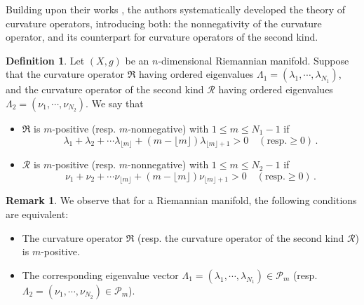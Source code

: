 \documentclass[12pt, twoside]{article}
\theoremstyle{definition}
\newtheorem{definition}[theorem]{Definition}
\newtheorem{remark}[theorem]{Remark}
\numberwithin{equation}{section}
\begin{document}
 
Building upon their works \cite{NPW23, NPWW23, PW21a, PW21b}, the authors systematically developed the theory of curvature operators, introducing both: the nonnegativity of the curvature operator, and its counterpart for curvature operators of the second kind.
\begin{definition}
Let $(X,g)$ be an $n$-dimensional Riemannian  manifold. Suppose that the curvature operator $\mathfrak{R}$ having ordered eigenvalues $\Lambda_{1}=(\lambda_{1},\cdots,\lambda_{N_1})$, and the curvature operator of the second kind $\mathcal{R}$ having ordered eigenvalues $\Lambda_{2}=(\nu_{1},\cdots,\nu_{N_2}) $. 
We say that 
\begin{itemize}
\item[(i)] $\mathfrak{R}$ is $m$-positive (resp. $m$-nonnegative) with $1\leq m\leq N_{1}-1$ if
$$\lambda_{1}+\lambda_{2}+\cdots\lambda_{\lfloor m\rfloor}+(m-\lfloor m\rfloor)\lambda_{\lfloor m\rfloor+1}>0\quad (\textrm{resp.} \geq 0) \,.$$
\item[(ii)] $\mathcal{R}$ is $m$-positive (resp. $m$-nonnegative) with $1\leq m\leq N_{2}-1$ if
$$\nu_{1}+\nu_{2}+\cdots\nu_{\lfloor m\rfloor}+(m-\lfloor m\rfloor)\nu_{\lfloor m\rfloor+1}>0\quad (\textrm{resp.} \geq 0)\,.$$
\end{itemize}
\end{definition}
\begin{remark}
We observe that for a Riemannian manifold, the following conditions are equivalent:
\begin{itemize}
\item[(i)] The curvature operator $\mathfrak{R}$ (resp. the curvature operator of the second kind $\mathcal{R}$) is $m$-positive.
\item[(ii)] The corresponding eigenvalue vector $\Lambda_1=(\lambda_{1},\cdots,\lambda_{N_{1}})\in\mathcal{P}_{m}$ 
 (resp. $\Lambda_2=(\nu_{1},\cdots,\nu_{N_{2}})\in\mathcal{P}_{m}$).
\end{itemize}
\end{remark}
\end{document}
